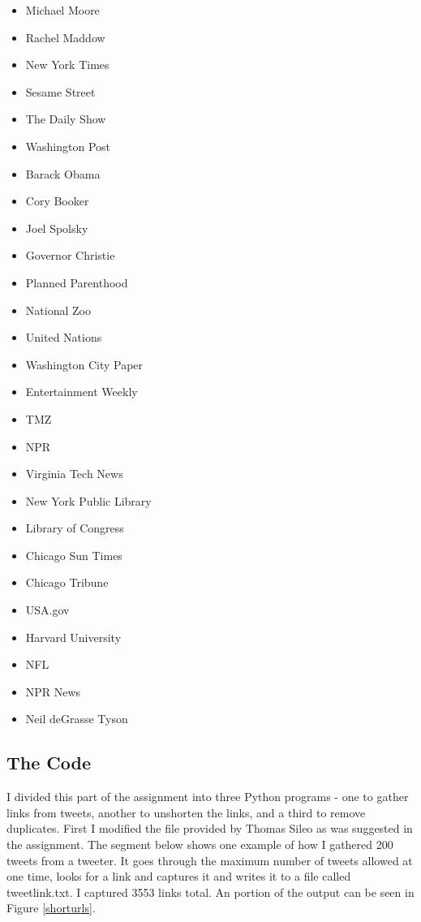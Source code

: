 \documentclass{article}
\begin{document}
\begin{itemize}
\item Michael Moore
\item Rachel Maddow
\item New York Times
\item Sesame Street
\item The Daily Show
\item Washington Post
\item Barack Obama
\item Cory Booker
\item Joel Spolsky
\item Governor Christie
\item Planned Parenthood
\item National Zoo
\item United Nations
\item Washington City Paper
\item Entertainment Weekly
\item TMZ
\item NPR
\item Virginia Tech News
\item New York Public Library
\item Library of Congress
\item Chicago Sun Times
\item Chicago Tribune
\item USA.gov
\item Harvard University
\item NFL
\item NPR News
\item Neil deGrasse Tyson
\end{itemize}

\subsection*{The Code}

I divided this part of the assignment into three Python programs - one to gather links from tweets, another to unshorten the links, and a third to remove duplicates. First I modified the file provided by Thomas Sileo as was suggested in the assignment. The segment below shows one example of how I gathered 200 tweets from a tweeter. It goes through the maximum number of tweets allowed at one time, looks for a link and captures it and writes it to a file called tweetlink.txt. I captured 3553 links total. An portion of the output can be seen in Figure \ref{shorturls}.
\end{document}

